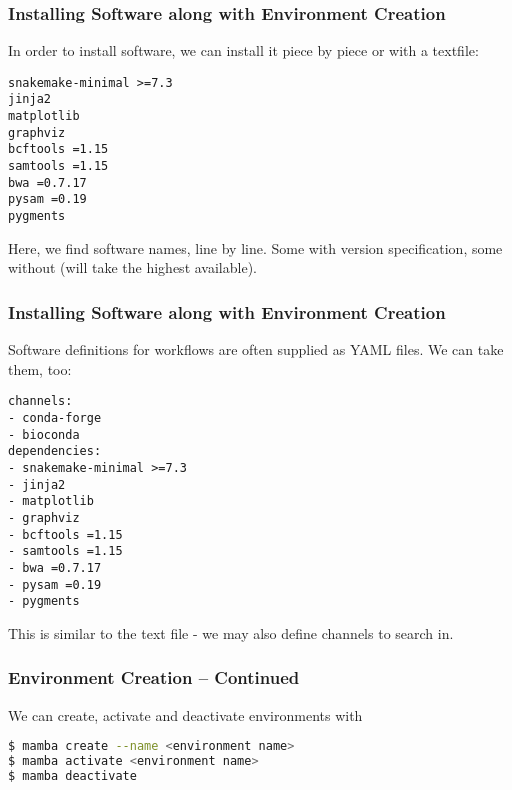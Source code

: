 \begin{frame}[fragile]
	\frametitle{Installing Software along with Environment Creation}
	In order to install software, we can install it piece by piece or with a textfile:
	\begin{lstlisting}[style=Plain]
snakemake-minimal >=7.3
jinja2
matplotlib
graphviz
bcftools =1.15
samtools =1.15
bwa =0.7.17
pysam =0.19
pygments
   \end{lstlisting}
   Here, we find software names, line by line. Some with version specification, some without (will take the highest available).
\end{frame}	

\begin{frame}[fragile]
	\frametitle{Installing Software along with Environment Creation}
	Software definitions for workflows are often supplied as YAML files. We can take them, too:
	\begin{lstlisting}[style=Plain]
channels:
- conda-forge
- bioconda
dependencies:
- snakemake-minimal >=7.3
- jinja2
- matplotlib
- graphviz
- bcftools =1.15
- samtools =1.15
- bwa =0.7.17
- pysam =0.19
- pygments
    \end{lstlisting}
    This is similar to the text file - we may also define channels to search in.
\end{frame}	

\begin{frame}[fragile]
	\frametitle{Environment Creation -- Continued}
	

	
\end{frame}		

\begin{frame}[fragile]
  We can create, activate and deactivate environments with
  \begin{lstlisting}[language=Bash, style=Shell]
$ mamba create --name <environment name>
$ mamba activate <environment name>
$ mamba deactivate
  \end{lstlisting}
\end{frame}



